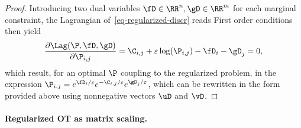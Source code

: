 \begin{proof} 
Introducing two dual variables $\fD\in\RR^n,\gD\in\RR^m$ for each marginal constraint, the Lagrangian of~\eqref{eq-regularized-discr} reads
First order conditions then yield
$$
	\frac{\partial\Lag(\P,\fD,\gD)}{\partial \P_{i,j}}= \C_{i,j} + \varepsilon \log(\P_{i,j}) - \fD_i -\gD_j=0,
$$
which result, for an optimal $\P$ coupling to the regularized problem, in the expression $\P_{i,j}=e^{\fD_i/\varepsilon}e^{-\C_{i,j}/\varepsilon}e^{\gD_j/\varepsilon}$, which can be rewritten in the form provided above using nonnegative vectors $\uD$ and $\vD$.
\end{proof} 

\paragraph{Regularized OT as matrix scaling.} 


